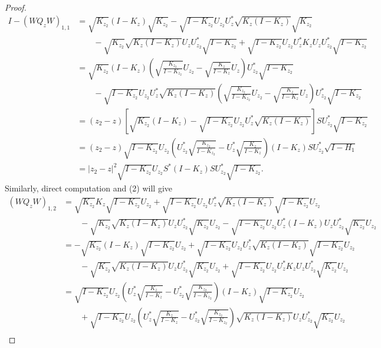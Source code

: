 \documentclass{amsart}
\begin{document}
\begin{proof}
\begin{align*}
I - (WQ_{z}W)_{1,1} &= \sqrt{K_{z_2}}(I - K_{z})\sqrt{K_{z_2}} - \sqrt{I - K_{z_2}}U_{z_2}U^{*}_{z}\sqrt{K_{z} (I - K_{z})}\sqrt{K_{z_2}} \\
                    & \qquad - \sqrt{K_{z_2}}\sqrt{K_{z}(I-K_{z})}U_{z}U^{*}_{z_2}\sqrt{I-K_{z_2}} + \sqrt{I-K_{z_2}}U_{z_2}U^{*}_{z}K_{z}U_{z}U^{*}_{z_2}\sqrt{I - K_{z_2}}\\
                    &= \sqrt{K_{z_2}}(I-K_z)(\sqrt{\frac{K_{z_2}}{I-K_{z_2}}}U_{z_2} - \sqrt{\frac{K_z}{I - K_z}}U_z)U_{z_2}^{*}\sqrt{I-K_{z_2}} \\
                    & \qquad- \sqrt{I-K_{z_2}}U_{z_2}U_{z}^{*}\sqrt{K_{z}(I- K_z)}(\sqrt{\frac{K_{z_2}}{I-K_{z_2}}}U_{z_2} - \sqrt{\frac{K_z}{I - K_z}}U_z)U^{*}_{z_2}\sqrt{I-K_{z_2}}\\
                    & = (z_2 - z)[\sqrt{K_{z_2}}(I-K_z)-\sqrt{I - K_{z_2}}U_{z_2}U^{*}_{z}\sqrt{K_{z}(I-K_z)}]SU_{z_2}^{*}\sqrt{I-K_{z_2}}\\
                    &= (z_2 - z)\sqrt{I-K_{z_2}}U_{z_2}(U^{*}_{z_2}\sqrt{\frac{K_{z_2}}{I-K_{z_2}}} - U^{*}_{z}\sqrt{\frac{K_z}{I-K_z}})(I-K_z)SU^{*}_{z_2}\sqrt{I-H_1}\\
                    &= |z_2 - z|^{2}\sqrt{I-K_{z_2}}U_{z_2}S^{*}(I-K_z)SU_{z_2}^{*}\sqrt{I-K_{z_2}}.
\end{align*}
Similarly, direct computation and (2) will give
\begin{align*}
(WQ_{z}W)_{1,2} &= \sqrt{K_{z_2}}K_{z}\sqrt{I - K_{z_2}}U_{z_2} + \sqrt{I - K_{z_2}}U_{z_2}U^{*}_{z}\sqrt{K_{z} (I - K_{z})}\sqrt{I - K_{z_2}}U_{z_2} \\
                & \qquad -\sqrt{K_{z_2}}\sqrt{K_{z}(I-K_{z})}U_{z}U^{*}_{z_2}\sqrt{K_{z_2}}U_{z_2} - \sqrt{I-K_{z_2}}U_{z_2}U^{*}_{z}(I - K_z)U_{z}U^{*}_{z_2}\sqrt{K_{z_2}}U_{z_2}\\
                &= -\sqrt{K_{z_2}}(I-K_{z})\sqrt{I - K_{z_2}}U_{z_2} + \sqrt{I - K_{z_2}}U_{z_2}U^{*}_{z}\sqrt{K_{z} (I - K_{z})}\sqrt{I - K_{z_2}}U_{z_2} \\
                & \qquad -\sqrt{K_{z_2}}\sqrt{K_{z}(I-K_{z})}U_{z}U^{*}_{z_2}\sqrt{K_{z_2}}U_{z_2} + \sqrt{I-K_{z_2}}U_{z_2}U^{*}_{z}K_{z}U_{z}U^{*}_{z_2}\sqrt{K_{z_2}}U_{z_2}\\
                & = \sqrt{I-K_{z_2}}U_{z_2}(U^{*}_{z}\sqrt{\frac{K_z}{I-K_z}} - U^{*}_{z_2}\sqrt{\frac{K_{z_2}}{I - K_{z_2}}})(I-K_z)\sqrt{I - K_{z_2}}U_{z_2} \\
                & \qquad + \sqrt{I-K_{z_2}}U_{z_2}(U^{*}_{z}\sqrt{\frac{K_z}{I-K_z}} - U^{*}_{z_2}\sqrt{\frac{K_{z_2}}{I - K_{z_2}}})\sqrt{K_{z}(I-K_z)}U_{z}U^{*}_{z_2}\sqrt{K_{z_2}}U_{z_2}\\

\end{align*}
\end{proof}
\end{document}
